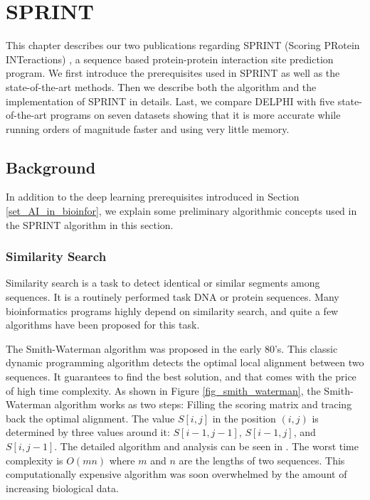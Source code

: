 \chapter{SPRINT \label{chap_3}}
This chapter describes our two publications regarding SPRINT (Scoring PRotein INTeractions) \cite{li2017sprint, li2020predicting}, a sequence based protein-protein interaction site prediction program. We first introduce the prerequisites used in SPRINT as well as the state-of-the-art methods. Then we describe both the algorithm and the implementation of SPRINT in details.  Last, we compare DELPHI with five state-of-the-art programs on seven datasets showing that it is more accurate while running orders of magnitude faster and using very little memory.
\section{Background}
In addition to the deep learning prerequisites introduced in Section \ref{set_AI_in_bioinfor}, we explain some preliminary algorithmic concepts used in the SPRINT algorithm in this section.
\subsection{Similarity Search}
Similarity search is a task to detect identical or similar segments among sequences. It is a routinely performed task DNA or protein sequences. Many bioinformatics programs highly depend on similarity search, and quite a few algorithms have been proposed for this task. 

The Smith-Waterman algorithm \cite{smith_waterman_1981} was proposed in the early 80's. This classic dynamic programming algorithm detects the optimal local alignment between two sequences. It guarantees to find the best solution, and that comes with the price of high time complexity. As shown in Figure \ref{fig_smith_waterman}, the Smith-Waterman algorithm works as two steps: Filling the scoring matrix and tracing back the optimal alignment. The value $S[i,j]$ in the position  $(i,j)$ is determined by three values around it: $S[i-1,j-1]$, $S[i-1,j]$, and $S[i,j-1]$. The detailed algorithm and analysis can be seen in \cite{smith_waterman_1981}. The worst time complexity is $O(mn)$ where $m$ and $n$ are the lengths of two sequences. This computationally expensive algorithm was soon overwhelmed by the amount of increasing biological data.

